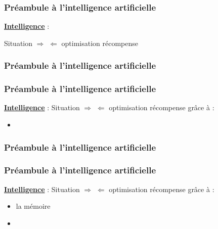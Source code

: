 \documentclass{formation}
\begin{document}
\begin{frame}
  \frametitle{Préambule à l'intelligence artificielle}
  \underline{\textbf{Intelligence}} :
  \newline
  \newline
  \begin{center}
    Situation $\Rightarrow$  $\Leftarrow$ optimisation récompense
    \newline
    \newline
  \end{center}
\end{frame}

\begin{frame}
  \frametitle{Préambule à l'intelligence artificielle}
\end{frame}

\begin{frame}
  \frametitle{Préambule à l'intelligence artificielle}
  \underline{\textbf{Intelligence}} :
  \newline
  \newline
  Situation $\Rightarrow$  $\Leftarrow$ optimisation récompense
  \newline
  \newline
  grâce à :
  \begin{itemize}
  \item {}
  \end{itemize}
\end{frame}

\begin{frame}
  \frametitle{Préambule à l'intelligence artificielle}
\end{frame}

\begin{frame}
  \frametitle{Préambule à l'intelligence artificielle}
  \underline{\textbf{Intelligence}} :
  \newline
  \newline
  Situation $\Rightarrow$  $\Leftarrow$ optimisation récompense
  \newline
  grâce à :
  \begin{itemize}
  \item la mémoire
  \item {}
  \end{itemize}
\end{frame}
\end{document}
